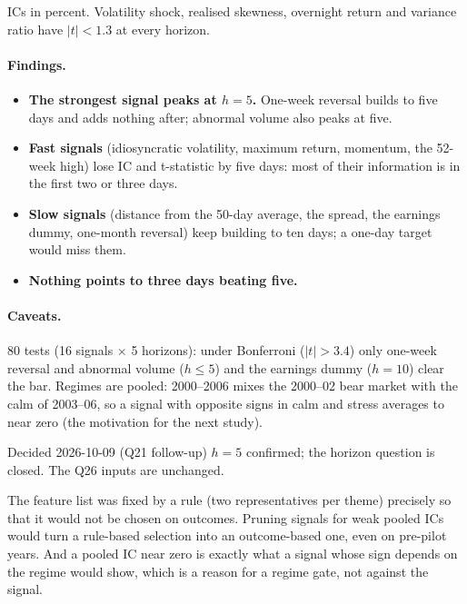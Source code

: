 ICs in percent. Volatility shock, realised skewness, overnight return and variance ratio have $|t| < 1.3$ at every
horizon.

\paragraph{Findings.}
\begin{itemize}
\item \textbf{The strongest signal peaks at $h=5$.} One-week reversal builds to five days and adds nothing after;
  abnormal volume also peaks at five.
\item \textbf{Fast signals} (idiosyncratic volatility, maximum return, momentum, the 52-week high) lose IC and
  t-statistic by five days: most of their information is in the first two or three days.
\item \textbf{Slow signals} (distance from the 50-day average, the spread, the earnings dummy, one-month reversal)
  keep building to ten days; a one-day target would miss them.
\item \textbf{Nothing points to three days beating five.}
\end{itemize}

\paragraph{Caveats.} 80 tests (16 signals $\times$ 5 horizons): under Bonferroni ($|t|>3.4$) only one-week reversal
and abnormal volume ($h\le5$) and the earnings dummy ($h=10$) clear the bar. Regimes are pooled: 2000--2006 mixes the
2000--02 bear market with the calm of 2003--06, so a signal with opposite signs in calm and stress averages to near
zero (the motivation for the next study).

\begin{decbox}{Decided 2026-10-09 (Q21 follow-up)}
$h = 5$ confirmed; the horizon question is closed. The Q26 inputs are unchanged.
\end{decbox}

\begin{whybox}
The feature list was fixed by a rule (two representatives per theme) precisely so that it would not be chosen on
outcomes. Pruning signals for weak pooled ICs would turn a rule-based selection into an outcome-based one, even on
pre-pilot years. And a pooled IC near zero is exactly what a signal whose sign depends on the regime would show,
which is a reason for a regime gate, not against the signal.
\end{whybox}

